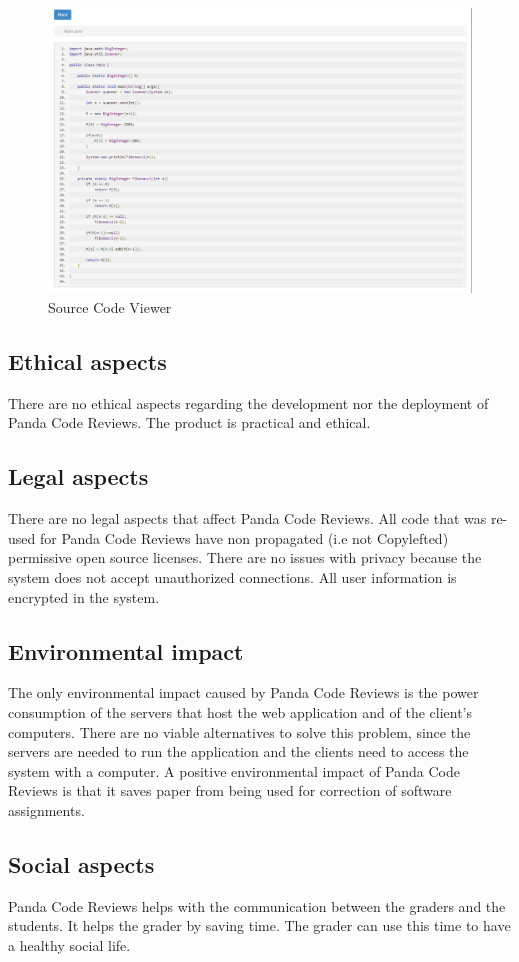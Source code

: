 \begin{figure}[H]
	\centering
	\includegraphics[width=\textwidth]{img/sourceviewer-screen}
	\caption{Source Code Viewer}
\end{figure}

\subsection{Ethical aspects}
There are no ethical aspects regarding the development nor the deployment of Panda Code Reviews. The product is practical and ethical.

\subsection{Legal aspects}
There are no legal aspects that affect Panda Code Reviews. All code that was re-used for
Panda Code Reviews have non propagated (i.e not Copylefted) permissive open source licenses.
There are no issues with privacy because the system does not accept unauthorized connections. All user information is encrypted in the system.

\subsection{Environmental impact}
The only environmental impact caused by Panda Code Reviews is the power consumption of the
servers that host the web application and of the client's computers. There are no viable
alternatives to solve this problem, since the servers are needed to run the application and
the clients need to access the system with a computer. A positive environmental impact of
Panda Code Reviews is that it saves paper from being used for correction of software
assignments.

\subsection{Social aspects}
Panda Code Reviews helps with the communication between the graders and the students. It
helps the grader by saving time. The grader can use this time to have a healthy social life.
